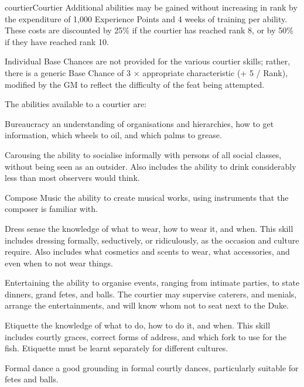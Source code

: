 \begin{Skill}[2.1]{courtier}{Courtier}
Additional abilities may be gained without increasing in rank by the
expenditure of 1,000 Experience Points and 4 weeks of training per
ability.  These costs are discounted by 25\% if the courtier has
reached rank 8, or by 50\% if they have reached rank 10.

Individual Base Chances are not provided for the various courtier
skills; rather, there is a generic Base Chance of 3 × appropriate
characteristic (+ 5 / Rank), modified by the GM to reflect the
difficulty of the feat being attempted.

The abilities available to a courtier are:

\begin{Description}
\item[Bureaucracy] an understanding of organisations and hierarchies,
  how to get information, which wheels to oil, and which palms to
  grease.

\item[Carousing] the ability to socialise informally with persons of
  all social classes, without being seen as an outsider.  Also
  includes the ability to drink considerably less than most observers
  would think.

\item[Compose Music] the ability to create musical works, using
  instruments that the composer is familiar with.

\item[Dress sense] the knowledge of what to wear, how to wear it, and
  when.  This skill includes dressing formally, seductively, or
  ridiculously, as the occasion and culture require.  Also includes
  what cosmetics and scents to wear, what accessories, and even when
  to not wear things.

\item[Entertaining] the ability to organise events, ranging from
  intimate parties, to state dinners, grand fetes, and balls.  The
  courtier may supervise caterers, and menials, arrange the
  entertainments, and will know whom not to seat next to the Duke.

\item[Etiquette] the knowledge of what to do, how to do it, and when.
  This skill includes courtly graces, correct forms of address, and
  which fork to use for the fish.  Etiquette must be learnt separately
  for different cultures.

\item[Formal dance] a good grounding in formal courtly dances,
  particularly suitable for fetes and balls.


\end{Description}
\end{Skill}
